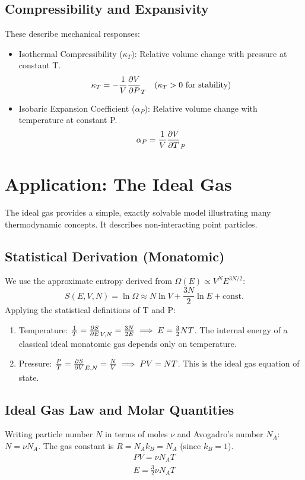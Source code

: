 \documentclass[10pt, letterpaper]{article}
\newcommand{\const}{\text{const.}}
\begin{document}
\subsection{Compressibility and Expansivity}
These describe mechanical responses:
\begin{itemize}
    \item Isothermal Compressibility ($\kappa_T$): Relative volume change with pressure at constant T.
        \begin{equation}
            \kappa_T = -\frac{1}{V} \pdv{V}{P}_{T} \quad (\kappa_T > 0 \text{ for stability})
        \end{equation}
    \item Isobaric Expansion Coefficient ($\alpha_P$): Relative volume change with temperature at constant P.
        \begin{equation}
            \alpha_P = \frac{1}{V} \pdv{V}{T}_{P}
        \end{equation}
\end{itemize}

\section{Application: The Ideal Gas}
The ideal gas provides a simple, exactly solvable model illustrating many thermodynamic concepts. It describes non-interacting point particles.

\subsection{Statistical Derivation (Monatomic)}
We use the approximate entropy derived from $\Omega(E) \propto V^N E^{3N/2}$:
\begin{equation*}
    S(E, V, N) = \ln \Omega \approx N \ln V + \frac{3N}{2} \ln E + \const
\end{equation*}
Applying the statistical definitions of T and P:
\begin{enumerate}
    \item Temperature: $\frac{1}{T} = \pdv{S}{E}_{V,N} = \frac{3N}{2E} \implies E = \frac{3}{2} N T$.
          The internal energy of a classical ideal monatomic gas depends only on temperature.
    \item Pressure: $\frac{P}{T} = \pdv{S}{V}_{E,N} = \frac{N}{V} \implies PV = N T$.
          This is the ideal gas equation of state.
\end{enumerate}

\subsection{Ideal Gas Law and Molar Quantities}
Writing particle number $N$ in terms of moles $\nu$ and Avogadro's number $N_A$: $N = \nu N_A$. The gas constant is $R=N_A k_B = N_A$ (since $k_B=1$).
\begin{gather}
    PV = \nu N_A T \\
    E = \frac{3}{2} \nu N_A T
\end{gather}
\end{document}
